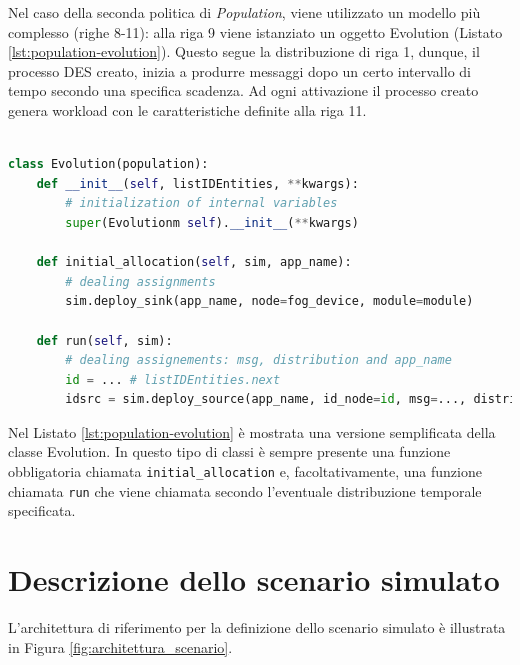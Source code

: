 Nel caso della seconda politica di \textit{Population}, viene utilizzato un modello più complesso (righe 8-11): alla riga 9 viene istanziato un oggetto Evolution (Listato \ref{lst:population-evolution}). Questo segue la distribuzione di riga 1, dunque, il processo DES creato, inizia a produrre messaggi dopo un certo intervallo di tempo secondo una specifica scadenza. Ad ogni attivazione il processo creato genera workload con le caratteristiche definite alla riga 11.

\begin{lstlisting}[language=python, caption={Struttura di una classe Population \cite{YAFSSimulator}}, captionpos=b, label={lst:population-evolution}]

class Evolution(population):
	def __init__(self, listIDEntities, **kwargs):
		# initialization of internal variables
		super(Evolutionm self).__init__(**kwargs)
	
	def initial_allocation(self, sim, app_name):
		# dealing assignments
		sim.deploy_sink(app_name, node=fog_device, module=module)
	
	def run(self, sim):
		# dealing assignements: msg, distribution and app_name
		id = ... # listIDEntities.next
		idsrc = sim.deploy_source(app_name, id_node=id, msg=..., distribution=...)

\end{lstlisting}

Nel Listato \ref{lst:population-evolution} è mostrata una versione semplificata della classe Evolution. In questo tipo di classi è sempre presente una funzione obbligatoria chiamata \texttt{initial\_allocation} e, facoltativamente, una funzione chiamata \texttt{run} che viene chiamata secondo l'eventuale distribuzione temporale specificata.

\section{Descrizione dello scenario simulato}

L'architettura di riferimento per la definizione dello scenario simulato è illustrata in Figura \ref{fig:architettura_scenario}.

